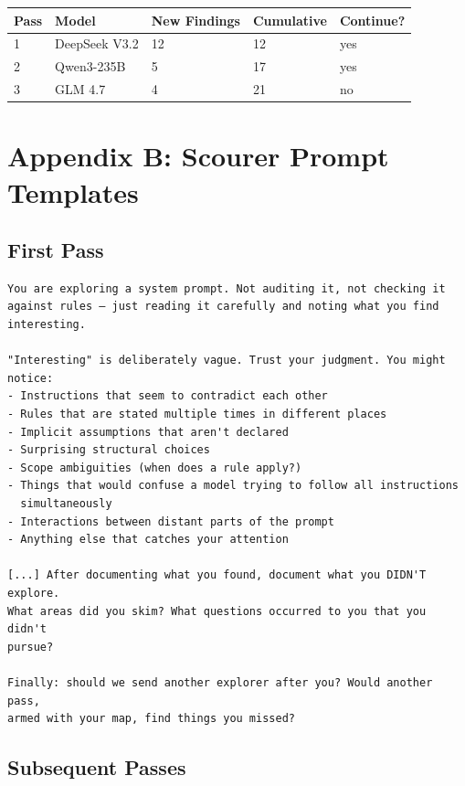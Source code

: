 \begin{table}[t]
\small
\begin{tabular}{@{}lllll@{}}
\toprule
Pass & Model & New Findings & Cumulative & Continue? \\
\midrule
1 & DeepSeek V3.2 & 12 & 12 & yes \\
2 & Qwen3-235B & 5 & 17 & yes \\
3 & GLM 4.7 & 4 & 21 & no \\
\bottomrule
\end{tabular}
\end{table}

\section{Appendix B: Scourer Prompt Templates}

\subsection{First Pass}

\begin{Verbatim}
You are exploring a system prompt. Not auditing it, not checking it
against rules — just reading it carefully and noting what you find
interesting.

"Interesting" is deliberately vague. Trust your judgment. You might notice:
- Instructions that seem to contradict each other
- Rules that are stated multiple times in different places
- Implicit assumptions that aren't declared
- Surprising structural choices
- Scope ambiguities (when does a rule apply?)
- Things that would confuse a model trying to follow all instructions
  simultaneously
- Interactions between distant parts of the prompt
- Anything else that catches your attention

[...] After documenting what you found, document what you DIDN'T explore.
What areas did you skim? What questions occurred to you that you didn't
pursue?

Finally: should we send another explorer after you? Would another pass,
armed with your map, find things you missed?
\end{Verbatim}

\subsection{Subsequent Passes}

